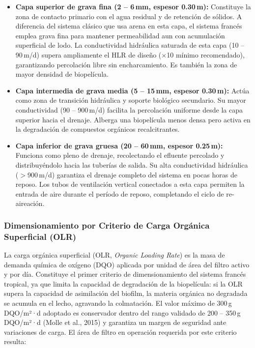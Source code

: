 \documentclass[12pt,a4paper]{article}
\begin{document}
\begin{itemize}[noitemsep,leftmargin=2em]
    \item \textbf{Capa superior de grava fina (2 -- 6\,mm, espesor 0.30\,m):} Constituye la zona de contacto primario con el agua residual y de retención de sólidos. A diferencia del sistema clásico que usa arena en esta capa, el sistema francés emplea grava fina para mantener permeabilidad aun con acumulación superficial de lodo. La conductividad hidráulica saturada de esta capa (10 -- 90\,m/d) supera ampliamente el HLR de diseño ($\times$10 mínimo recomendado), garantizando percolación libre sin encharcamiento. Es también la zona de mayor densidad de biopelícula.
    \item \textbf{Capa intermedia de grava media (5 -- 15\,mm, espesor 0.30\,m):} Actúa como zona de transición hidráulica y soporte biológico secundario. Su mayor conductividad (90 -- 900\,m/d) facilita la percolación uniforme desde la capa superior hacia el drenaje. Alberga una biopelícula menos densa pero activa en la degradación de compuestos orgánicos recalcitrantes.
    \item \textbf{Capa inferior de grava gruesa (20 -- 60\,mm, espesor 0.25\,m):} Funciona como pleno de drenaje, recolectando el efluente percolado y distribuyéndolo hacia las tuberías de salida. Su alta conductividad hidráulica ($>$900\,m/d) garantiza el drenaje completo del sistema en pocas horas de reposo. Los tubos de ventilación vertical conectados a esta capa permiten la entrada de aire durante el período de reposo, completando el ciclo de re-aireación.
\end{itemize}

\subsubsection*{Dimensionamiento por Criterio de Carga Orgánica Superficial (OLR)}

La carga orgánica superficial (OLR, \textit{Organic Loading Rate}) es la masa de demanda química de oxígeno (DQO) aplicada por unidad de área del filtro activo y por día. Constituye el primer criterio de dimensionamiento del sistema francés tropical, ya que limita la capacidad de degradación de la biopelícula: si la OLR supera la capacidad de asimilación del biofilm, la materia orgánica no degradada se acumula en el lecho, agravando la colmatación. El valor máximo de 300\,g\,DQO/m²·d adoptado es conservador dentro del rango validado de 200 -- 350\,g\,DQO/m²·d (Molle et al., 2015) y garantiza un margen de seguridad ante variaciones de carga. El área de filtro en operación requerida por este criterio resulta:
\end{document}
